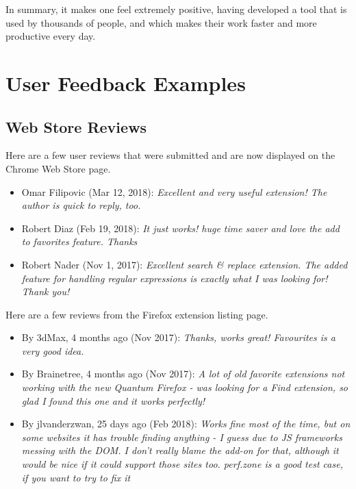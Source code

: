 \documentclass[bsc,frontabs,twoside,singlespacing,parskip,deptreport]{infthesis}
\begin{document}
In summary, it makes one feel extremely positive, having developed a tool that is used by thousands of people, and which makes their work faster and more productive every day.

\appendix
\chapter{User Feedback Examples}

\section{Web Store Reviews}
\label{section:feedback-reviews}
Here are a few user reviews that were submitted and are now displayed on the Chrome Web Store page.
\begin{itemize}
\item
Omar Filipovic (Mar 12, 2018): \textit{Excellent and very useful extension! The author is quick to reply, too.}
\item
Robert Diaz (Feb 19, 2018): \textit{It just works! huge time saver and love the add to favorites feature. Thanks}
\item
Robert Nader (Nov 1, 2017): \textit{Excellent search \& replace extension. The added feature for handling regular expressions is exactly what I was looking for! Thank you!}
\end{itemize}

Here are a few reviews from the Firefox extension listing page.
\begin{itemize}
\item
By 3dMax, 4 months ago (Nov 2017): \textit{Thanks, works great! Favourites is a very good idea.}
\item
By Brainetree, 4 months ago (Nov 2017): \textit{A lot of old favorite extensions not working with the new Quantum Firefox - was looking for a Find extension, so glad I found this one and it works perfectly!}
\item
By jlvanderzwan, 25 days ago (Feb 2018): \textit{Works fine most of the time, but on some websites it has trouble finding anything - I guess due to JS frameworks messing with the DOM. I don't really blame the add-on for that, although it would be nice if it could support those sites too. perf.zone is a good test case, if you want to try to fix it}
\end{itemize}
\end{document}
